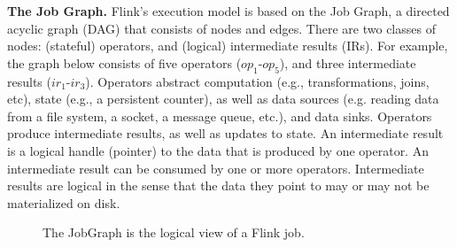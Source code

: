\documentclass[11pt]{article}
\begin{document}
\textbf{The Job Graph.} Flink's execution model is based on the Job Graph, a directed acyclic graph (DAG) that consists of nodes and edges. There are two classes of nodes: (stateful) operators, and (logical) intermediate results (IRs). For example, the graph below consists of five operators ($op_1$-$op_5$), and three intermediate results ($ir_1$-$ir_3$). Operators abstract computation (e.g., transformations, joins, etc), state (e.g., a persistent counter), as well as data sources (e.g. reading data from a file system, a socket, a message queue, etc.), and data sinks. Operators produce intermediate results, as well as updates to state. An intermediate result is a logical handle (pointer) to the data that is produced by one operator. An intermediate result can be consumed by one or more operators. Intermediate results are logical in the sense that the data they point to may or may not be materialized on disk.

\begin{figure}[ht]
\centering
{}
\label{fig:JobGraph}
\caption{The JobGraph is the logical view of a Flink job.}
\end{figure}
\end{document}
